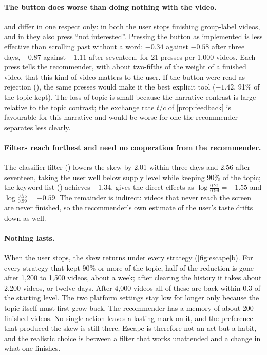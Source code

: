 \paragraph{The button does worse than doing nothing with the video.}  and  differ in one respect only: in both the user stops finishing group-label videos, and in  they also press ``not interested''. Pressing the button as implemented is less effective than scrolling past without a word: $-0.34$ against $-0.58$ after three days, $-0.87$ against $-1.11$ after seventeen, for 21 presses per 1{,}000 videos. Each press tells the recommender, with about two-fifths of the weight of a finished video, that this kind of video matters to the user. If the button were read as rejection (), the same presses would make it the best explicit tool ($-1.42$, 91\% of the topic kept). The loss of topic is small because the narrative contrast is large relative to the topic contrast; the exchange rate $t/c$ of \cref{prop:feedback} is favourable for this narrative and would be worse for one the recommender separates less clearly.

\paragraph{Filters reach furthest and need no cooperation from the recommender.} The classifier filter () lowers the skew by 2.01 within three days and 2.56 after seventeen, taking the user well below supply level while keeping 90\% of the topic; the keyword list () achieves $-1.34$.  gives the direct effects as $\log\frac{0.21}{0.99}=-1.55$ and $\log\frac{0.55}{0.99}=-0.59$. The remainder is indirect: videos that never reach the screen are never finished, so the recommender's own estimate of the user's taste drifts down as well.

\paragraph{Nothing lasts.} When the user stops, the skew returns under every strategy (\cref{fig:escape}b). For every strategy that kept 90\% or more of the topic, half of the reduction is gone after 1{,}200 to 1{,}500 videos, about a week; after clearing the history it takes about 2{,}200 videos, or twelve days. After 4{,}000 videos all of these are back within 0.3 of the starting level. The two platform settings stay low for longer only because the topic itself must first grow back. The recommender has a memory of about 200 finished videos. No single action leaves a lasting mark on it, and the preference that produced the skew is still there. Escape is therefore not an act but a habit, and the realistic choice is between a filter that works unattended and a change in what one finishes.
